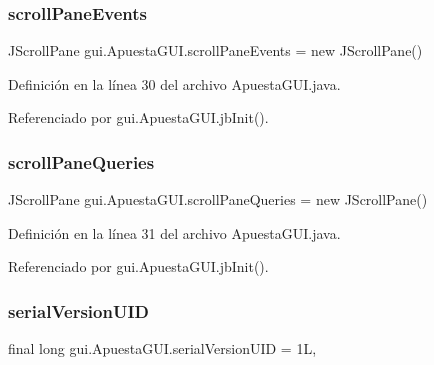 \mbox{\label{classgui_1_1ApuestaGUI_aeaccc6b748bdd9a346f7e0b3274c4aad}} 
\subsubsection{\texorpdfstring{scrollPaneEvents}{scrollPaneEvents}}
{\footnotesize\ttfamily J\+Scroll\+Pane gui.\+Apuesta\+G\+U\+I.\+scroll\+Pane\+Events = new J\+Scroll\+Pane()\hspace{0.3cm}{\ttfamily [private]}}



Definición en la línea 30 del archivo Apuesta\+G\+U\+I.\+java.



Referenciado por gui.\+Apuesta\+G\+U\+I.\+jb\+Init().

\mbox{\label{classgui_1_1ApuestaGUI_a9fe3c26976c3e329c5cdaafe55cfc6d9}} 
\subsubsection{\texorpdfstring{scrollPaneQueries}{scrollPaneQueries}}
{\footnotesize\ttfamily J\+Scroll\+Pane gui.\+Apuesta\+G\+U\+I.\+scroll\+Pane\+Queries = new J\+Scroll\+Pane()\hspace{0.3cm}{\ttfamily [private]}}



Definición en la línea 31 del archivo Apuesta\+G\+U\+I.\+java.



Referenciado por gui.\+Apuesta\+G\+U\+I.\+jb\+Init().

\mbox{\label{classgui_1_1ApuestaGUI_abebe7eec2f66fa264e15aa3222a8e19c}} 
\subsubsection{\texorpdfstring{serialVersionUID}{serialVersionUID}}
{\footnotesize\ttfamily final long gui.\+Apuesta\+G\+U\+I.\+serial\+Version\+U\+ID = 1L\hspace{0.3cm}{\ttfamily [static]}, {\ttfamily [private]}}



